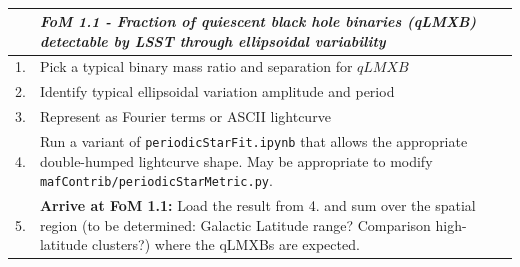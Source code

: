 \begin{table}[h]
  \small
  \begin{tabular}{c p{12cm}}
    & {\it FoM 1.1 - Fraction of quiescent black hole binaries (qLMXB) detectable by LSST through ellipsoidal variability} \\
    \hline
  1. & Pick a typical binary mass ratio and separation for $qLMXB$ \\
  2. & Identify typical ellipsoidal variation amplitude and period \\
  3. & Represent as Fourier terms or ASCII lightcurve \\
  4. & Run a variant of {\tt periodicStarFit.ipynb} that allows the appropriate double-humped lightcurve shape. May be appropriate to modify {\tt mafContrib/periodicStarMetric.py}. \\
  5. & {\bf Arrive at FoM 1.1:} Load the result from 4. and sum over the spatial region (to be determined: Galactic Latitude range? Comparison high-latitude clusters?) where the qLMXBs are expected.\\
\hline
    \end{tabular}
 \caption{}
  \label{table:pseudoFOM_1p1}
\end{table}


